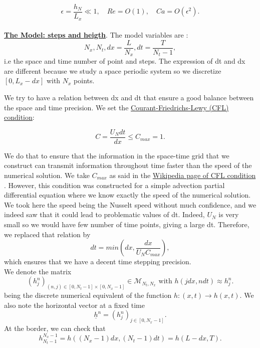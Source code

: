 \documentclass[12pt]{article}
\begin{document}
\begin{equation}\label{num_scaling_conditions}
\epsilon = \frac{h_N}{L_x} \ll 1, \quad Re=O(1),\quad Ca=O(\epsilon^2).
\end{equation}
\\

\underline{\textbf{The Model: steps and heigth}}. The model variables are : 
\begin{equation}
    N_x, N_t, dx = \frac{L}{N_x}, dt=\frac{T}{N_t -1},
\end{equation}
i.e the space and time number of point and steps. The expression of dt and dx are different 
because we study a space periodic system so we discretize $[0, L_x-dx]$ with $N_x$ points.  

We try to have a relation between dx and dt that ensure a good balance between the space and time precision. We set the \underline{Courant-Friedrichs-Lewy (CFL) condition}: 

\begin{equation}\label{CFL_conditions}
    C=\frac{U_N dt}{dx}\leq C_{max}=1.
\end{equation}

We do that to ensure that the information in the space-time grid that we construct can transmit information throughout time faster than the speed of the numerical solution. We take $C_{max}$ as said in the \href{https://en.wikipedia.org/wiki/Courant%E2%80%93Friedrichs%E2%80%93Lewy_condition}{Wikipedia page of CFL condition }. However, this condition was constructed for a simple advection partial differential equation where we know exactly the speed of the numerical solution. We took here the speed being the Nusselt speed without much confidence, and we indeed saw that it could lead to problematic values of dt. Indeed, $U_N$ is very small so we would have few number of time points, giving a large dt. Therefore, we replaced that relation by
\begin{equation}\label{time_step}
dt=min(dx, \frac{dx}{U_N C_{max}}),
\end{equation}
which ensures that we have a decent time stepping precision.
\\

We denote the matrix 
\begin{equation}
(h_j^n)_{(n, j)\in [0,N_t-1]\times[0, N_x-1]} \in \mathcal{M}_{N_t, N_x}  \text{ with } h(jdx,ndt) \approx h_j^n.
\end{equation}
being the discrete numerical equivalent of the function $h:(x,t)\rightarrow h(x,t).$
We also note the horizontal vector at a fixed time $$\underline{h}^n = (h_j^n)_{j\in[0, N_x-1]}.$$
At the border, we can check that $$h_{N_t-1}^{N_x-1}=h((N_x-1)dx,(N_t-1)dt)= h(L-dx, T).$$
\end{document}

